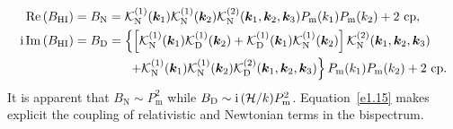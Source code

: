 \begin{itemize}
\begin{align}
\mathrm{Re}\left( B_{{\mathrm{HI}}} \right) &= B_\mathrm{N} = \mathcal{K}^{(1)}_\mathrm{N}(\bm {k}_1) \mathcal{K}^{(1)}_\mathrm{N}(\bm {k}_2) \mathcal{K}^{(2)}_\mathrm{N}(\bm {k}_1,\bm {k}_2,\bm {k}_3)P_\mathrm{m} (k_{1}) P_\mathrm{m} (k_{2}) + \text{2 cp}, \label{e1.14}\\
\mathrm{i\,} \mathrm{Im} \left(B_{{\mathrm{HI}}}\right) &= B_\mathrm{D} = \left\{ \left[ \mathcal{K}^{(1)}_{\mathrm{N}}(\bm {k}_1)\mathcal{K}^{(1)}_{\mathrm{D}}(\bm {k}_2) + \mathcal{K}^{(1)}_{\mathrm{D}}(\bm {k}_1)\mathcal{K}^{(1)}_{\mathrm{N}}(\bm {k}_2)\right]\mathcal{K}^{(2)}_{\mathrm{N}}(\bm {k}_1,\bm {k}_2,\bm {k}_3) \right. \label{e1.15}\\ \nonumber 
&\left. ~~~~~~~~~~~~~ +\mathcal{K}^{(1)}_{\mathrm{N}}(\bm {k}_1)\mathcal{K}^{(1)}_{\mathrm{N}}(\bm {k}_2)\mathcal{K}^{(2)}_{\mathrm{D}}(\bm {k}_1,\bm {k}_2,\bm {k}_3)\right\}P_\mathrm{m} (k_{1})P_\mathrm{m} (k_{2})+\text{2 cp}.
\end{align}
It is apparent that {$B_\mathrm{N} \sim P_\mathrm{m} ^2$ while $B_\mathrm{D} \sim \mathrm{i\,} (\mathcal{H}/k) P_\mathrm{m} ^2$.}
Equation~\eqref{e1.15} makes explicit the coupling of relativistic  and Newtonian terms in the bispectrum.
\end{itemize}

